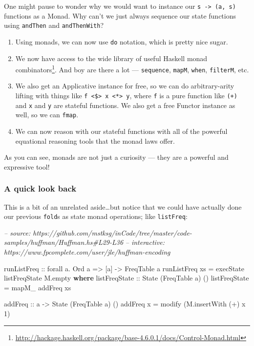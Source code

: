 \documentclass[]{article}
\newenvironment{Shaded}{}{}
\newcommand{\CommentTok}[1]{\textcolor[rgb]{0.38,0.63,0.69}{\textit{#1}}}
\newcommand{\DataTypeTok}[1]{\textcolor[rgb]{0.56,0.13,0.00}{#1}}
\newcommand{\DecValTok}[1]{\textcolor[rgb]{0.25,0.63,0.44}{#1}}
\newcommand{\FunctionTok}[1]{\textcolor[rgb]{0.02,0.16,0.49}{#1}}
\newcommand{\KeywordTok}[1]{\textcolor[rgb]{0.00,0.44,0.13}{\textbf{#1}}}
\newcommand{\NormalTok}[1]{#1}
\newcommand{\OtherTok}[1]{\textcolor[rgb]{0.00,0.44,0.13}{#1}}
\renewcommand{\href}[2]{#2\footnote{\url{#1}}}
\begin{document}
One might pause to wonder why we would want to instance our
\texttt{s\ -\textgreater{}\ (a,\ s)} functions as a Monad. Why can't we just
always sequence our state functions using \texttt{andThen} and
\texttt{andThenWith}?

\begin{enumerate}
\def\labelenumi{\arabic{enumi}.}
\item
  Using monads, we can now use \texttt{do} notation, which is pretty nice sugar.
\item
  We now have access to the wide library of useful Haskell
  \href{http://hackage.haskell.org/package/base-4.6.0.1/docs/Control-Monad.html}{monad
  combinators}. And boy are there a lot --- \texttt{sequence}, \texttt{mapM},
  \texttt{when}, \texttt{filterM}, etc.
\item
  We also get an Applicative instance for free, so we can do arbitrary-arity
  lifting with things like
  \texttt{f\ \textless{}\$\textgreater{}\ x\ \textless{}*\textgreater{}\ y},
  where \texttt{f} is a pure function like \texttt{(+)} and \texttt{x} and
  \texttt{y} are stateful functions. We also get a free Functor instance as
  well, so we can \texttt{fmap}.
\item
  We can now reason with our stateful functions with all of the powerful
  equational reasoning tools that the monad laws offer.
\end{enumerate}

As you can see, monads are not just a curiosity --- they are a powerful and
expressive tool!

\hypertarget{a-quick-look-back}{%
\subsubsection{A quick look back}\label{a-quick-look-back}}

This is a bit of an unrelated aside\ldots{}but notice that we could have
actually done our previous \texttt{fold}s as state monad operations; like
\texttt{listFreq}:

\begin{Shaded}
\begin{Highlighting}[]
\CommentTok{-- source: https://github.com/mstksg/inCode/tree/master/code-samples/huffman/Huffman.hs#L29-L36}
\CommentTok{-- interactive: https://www.fpcomplete.com/user/jle/huffman-encoding}

\OtherTok{runListFreq ::}\NormalTok{ forall a}\FunctionTok{.} \DataTypeTok{Ord}\NormalTok{ a }\OtherTok{=>}\NormalTok{ [a] }\OtherTok{->} \DataTypeTok{FreqTable}\NormalTok{ a}
\NormalTok{runListFreq xs }\FunctionTok{=}\NormalTok{ execState listFreqState M.empty}
  \KeywordTok{where}
\OtherTok{    listFreqState ::} \DataTypeTok{State}\NormalTok{ (}\DataTypeTok{FreqTable}\NormalTok{ a) ()}
\NormalTok{    listFreqState }\FunctionTok{=}\NormalTok{ mapM_ addFreq xs}

\OtherTok{    addFreq ::}\NormalTok{ a }\OtherTok{->} \DataTypeTok{State}\NormalTok{ (}\DataTypeTok{FreqTable}\NormalTok{ a) ()}
\NormalTok{    addFreq x }\FunctionTok{=}\NormalTok{ modify (M.insertWith (}\FunctionTok{+}\NormalTok{) x }\DecValTok{1}\NormalTok{)}
\end{Highlighting}
\end{Shaded}
\end{document}
